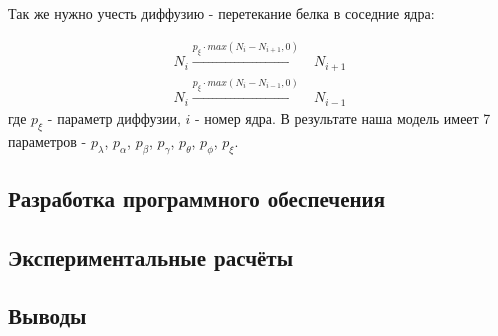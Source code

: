 Так же нужно учесть диффузию - перетекание белка в соседние ядра:

\begin{align*}
N_i   \xrightarrow{p_{\xi} \cdot max(N_i - N_{i+1}, 0)} & N_{i+1} \\
N_i   \xrightarrow{p_{\xi} \cdot max(N_i - N_{i-1}, 0)} & N_{i-1}
\end{align*}
где $p_{\xi}$ - параметр диффузии, $i$ - номер ядра.
В результате наша модель имеет 7 параметров - $p_{\lambda}$, $p_{\alpha}$, $p_{\beta}$, $p_{\gamma}$, $p_{\theta}$, $p_{\phi}$, $p_{\xi}$.


\subsection{Разработка программного обеспечения}

\subsection{Экспериментальные расчёты}
\begin{figure}[h]
\end{figure}
\begin{figure}[h]
\end{figure}

\subsection{Выводы}
